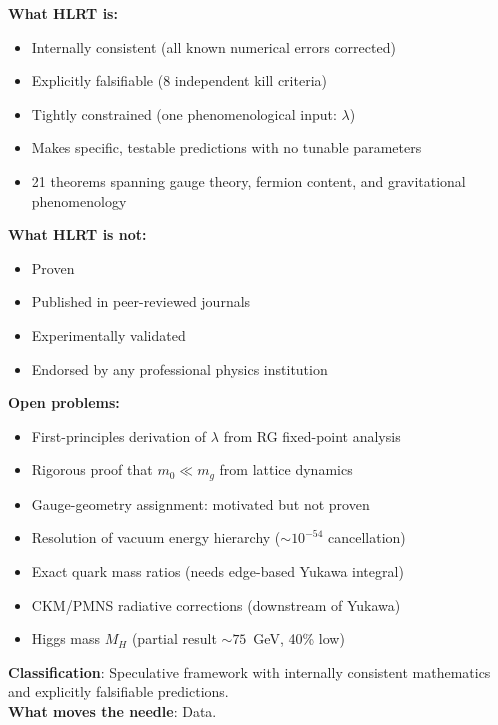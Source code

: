 \documentclass[11pt,letterpaper]{article}
\begin{document}
\begin{tcolorbox}[colback=gray!8!white,colframe=black,title=Current Status of HLRT]

\textbf{What HLRT is:}
\begin{itemize}[nosep]
  \item[$\checkmark$] Internally consistent (all known numerical errors corrected)
  \item[$\checkmark$] Explicitly falsifiable (8 independent kill criteria)
  \item[$\checkmark$] Tightly constrained (one phenomenological input: $\lambda$)
  \item[$\checkmark$] Makes specific, testable predictions with no tunable parameters
  \item[$\checkmark$] 21 theorems spanning gauge theory, fermion content,
        and gravitational phenomenology
\end{itemize}

\textbf{What HLRT is not:}
\begin{itemize}[nosep]
  \item[$\times$] Proven
  \item[$\times$] Published in peer-reviewed journals
  \item[$\times$] Experimentally validated
  \item[$\times$] Endorsed by any professional physics institution
\end{itemize}

\textbf{Open problems:}
\begin{itemize}[nosep]
  \item First-principles derivation of $\lambda$ from RG fixed-point analysis
  \item Rigorous proof that $m_0 \ll m_g$ from lattice dynamics
  \item Gauge-geometry assignment: motivated but not proven
  \item Resolution of vacuum energy hierarchy ($\sim10^{-54}$ cancellation)
  \item Exact quark mass ratios (needs edge-based Yukawa integral)
  \item CKM/PMNS radiative corrections (downstream of Yukawa)
  \item Higgs mass $M_H$ (partial result $\sim75$~GeV, 40\% low)
\end{itemize}

\textbf{Classification}: Speculative framework with internally consistent
mathematics and explicitly falsifiable predictions.\\[4pt]
\textbf{What moves the needle}: Data.
\end{tcolorbox}
\end{document}
